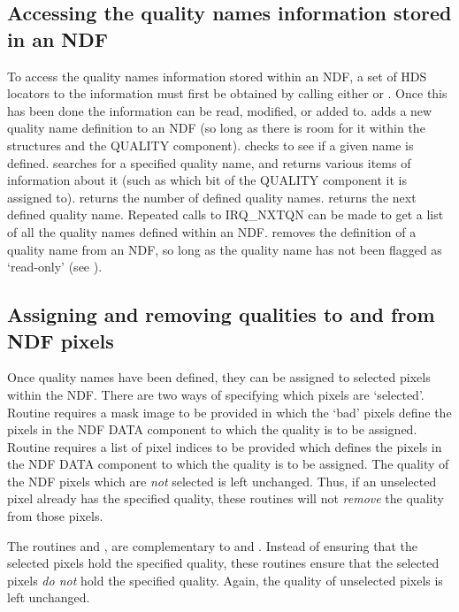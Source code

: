 \documentclass[twoside,11pt,nolof]{starlink}
\begin{document}
\subsection{Accessing the quality names information stored in an NDF}

To access the quality names information stored within an NDF, a set of
HDS locators to the information must first be obtained by calling either
 or . Once this has been done the information can be read, modified,
or added to.  adds a new quality name
definition to an NDF (so long as there is room for it within the
structures and the QUALITY component). 
checks to see if a given name is defined. 
searches for a specified quality name, and returns various items of
information about it (such as which bit of the QUALITY component it is
assigned to).  returns the number of
defined quality names.  returns the next
defined quality name. Repeated calls to IRQ\_NXTQN can be made to get a
list of all the quality names defined within an NDF.
 removes the definition of a quality name
from an NDF, so long as the quality name has not been flagged as
`read-only' (see ).

\subsection{Assigning and removing qualities to and from NDF pixels}

Once quality names have been defined, they can be assigned to selected
pixels within the NDF. There are two ways of specifying which pixels are
`selected'. Routine  requires a mask image
to be provided in which the `bad' pixels define the pixels in the NDF
DATA component to which the quality is to be assigned. Routine
 requires a list of pixel indices to be
provided which defines the pixels in the NDF DATA component to which the
quality is to be assigned. The quality of the NDF pixels which are \emph{not} selected is left unchanged. Thus, if an unselected pixel already has
the specified quality, these routines will not \emph{remove} the quality
from those pixels.

The routines  and
, are complementary to
 and .
Instead of ensuring that the selected pixels hold the specified quality,
these routines ensure that the selected pixels \emph{do not} hold the
specified quality. Again, the quality of unselected pixels is left
unchanged.
\end{document}
